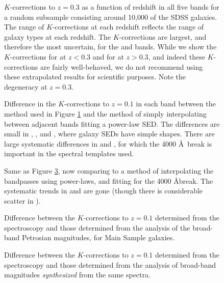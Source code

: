 \clearpage
{}
\begin{figure}
\figurenum{\fignum}
\caption{\label{k_kcorrect_plot} $K$-corrections to $z=0.3$ as a
function of redshift in all five bands for a random subsample
consisting around 10,000 of the SDSS galaxies.  The range of
$K$-corrections at each redshift reflects the range of galaxy types at
each redshift.  The $K$-corrections are largest, and therefore the
most uncertain, for the  and  bands. While
we show the $K$-corrections for  at $z<0.3$ and for
 at $z>0.3$, and indeed these $K$-corrections are fairly
well-behaved, we do not recommend using these extrapolated results for
scientific purposes. Note the degeneracy at $z=0.3$.}
\end{figure}

\clearpage
{}
\begin{figure}
\figurenum{\fignum}
\caption{\label{compareci} Difference in the $K$-corrections to
$z=0.1$ in each band between the method used in Figure
\ref{k_kcorrect_plot} and the method of simply interpolating between
adjacent bands fitting a power-law SED. The differences are small in
, , and , where galaxy SEDs
have simple shapes. There are large systematic differences in
 and , for which the 4000 \AA\ break is
important in the spectral templates used. }
\end{figure}

\clearpage
{}
\begin{figure}
\figurenum{\fignum}
\caption{\label{comparecibreak} Same as Figure \ref{comparecibreak},
now comparing to a method of interpolating the bandpasses using
power-laws, and fitting for the 4000 \AA break. The systematic trends
in  and  are gone (though there is
considerable scatter in ). }
\end{figure}

\clearpage
{}
\begin{figure}
\figurenum{\fignum}
\caption{\label{k_speck_plot.0.1} Difference between the
$K$-corrections to $z=0.1$ determined from the spectroscopy and those
determined from the analysis of the broad-band Petrosian magnitudes, for
Main Sample galaxies.}
\end{figure}

\clearpage
{}
\begin{figure}
\figurenum{\fignum}
\caption{\label{k_speck_plot.fitfib.0.1} Difference between the
$K$-corrections to $z=0.1$ determined from the spectroscopy and those
determined from the analysis of broad-band magnitudes {\it
synthesized} from the same spectra.}
\end{figure}


